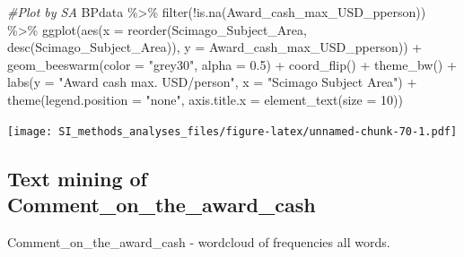 \documentclass[
]{article}
\newenvironment{Shaded}{\begin{snugshade}}{\end{snugshade}}
\newcommand{\AttributeTok}[1]{\textcolor[rgb]{0.77,0.63,0.00}{#1}}
\newcommand{\CommentTok}[1]{\textcolor[rgb]{0.56,0.35,0.01}{\textit{#1}}}
\newcommand{\ConstantTok}[1]{\textcolor[rgb]{0.00,0.00,0.00}{#1}}
\newcommand{\DecValTok}[1]{\textcolor[rgb]{0.00,0.00,0.81}{#1}}
\newcommand{\FloatTok}[1]{\textcolor[rgb]{0.00,0.00,0.81}{#1}}
\newcommand{\FunctionTok}[1]{\textcolor[rgb]{0.00,0.00,0.00}{#1}}
\newcommand{\NormalTok}[1]{#1}
\newcommand{\OtherTok}[1]{\textcolor[rgb]{0.56,0.35,0.01}{#1}}
\newcommand{\SpecialCharTok}[1]{\textcolor[rgb]{0.00,0.00,0.00}{#1}}
\newcommand{\StringTok}[1]{\textcolor[rgb]{0.31,0.60,0.02}{#1}}
\begin{document}
\begin{Shaded}
\begin{Highlighting}[]
\CommentTok{\#Plot by SA }
\NormalTok{BPdata }\SpecialCharTok{\%\textgreater{}\%} 
  \FunctionTok{filter}\NormalTok{(}\SpecialCharTok{!}\FunctionTok{is.na}\NormalTok{(Award\_cash\_max\_USD\_pperson)) }\SpecialCharTok{\%\textgreater{}\%}
  \FunctionTok{ggplot}\NormalTok{(}\FunctionTok{aes}\NormalTok{(}\AttributeTok{x =} \FunctionTok{reorder}\NormalTok{(Scimago\_Subject\_Area, }\FunctionTok{desc}\NormalTok{(Scimago\_Subject\_Area)), }\AttributeTok{y =}\NormalTok{ Award\_cash\_max\_USD\_pperson)) }\SpecialCharTok{+} 
  \FunctionTok{geom\_beeswarm}\NormalTok{(}\AttributeTok{color =} \StringTok{"grey30"}\NormalTok{, }\AttributeTok{alpha =} \FloatTok{0.5}\NormalTok{) }\SpecialCharTok{+}
  \FunctionTok{coord\_flip}\NormalTok{() }\SpecialCharTok{+}
  \FunctionTok{theme\_bw}\NormalTok{() }\SpecialCharTok{+} 
  \FunctionTok{labs}\NormalTok{(}\AttributeTok{y =} \StringTok{"Award cash max. USD/person"}\NormalTok{, }\AttributeTok{x =} \StringTok{"Scimago Subject Area"}\NormalTok{) }\SpecialCharTok{+} 
  \FunctionTok{theme}\NormalTok{(}\AttributeTok{legend.position =} \StringTok{"none"}\NormalTok{, }\AttributeTok{axis.title.x =} \FunctionTok{element\_text}\NormalTok{(}\AttributeTok{size =} \DecValTok{10}\NormalTok{))}
\end{Highlighting}
\end{Shaded}

\texttt{[image: SI\_methods\_analyses\_files/figure-latex/unnamed-chunk-70-1.pdf]}

\hypertarget{text-mining-of-comment_on_the_award_cash}{%
\subsection{Text mining of
Comment\_on\_the\_award\_cash}\label{text-mining-of-comment_on_the_award_cash}}

Comment\_on\_the\_award\_cash - wordcloud of frequencies all words.

\begin{Shaded}
\end{Shaded}
\end{document}
